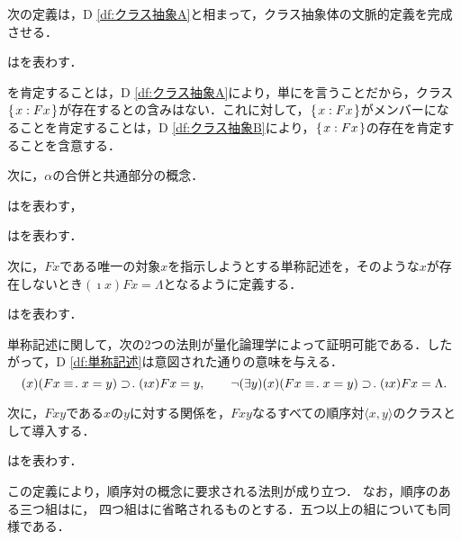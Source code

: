 次の定義は，D \ref{df:クラス抽象A}と相まって，クラス抽象体の文脈的定義を完成させる．

\begin{df}
\label{df:クラス抽象B}
はを表わす．
\end{df}
\noindent{}を肯定することは，D \ref{df:クラス抽象A}により，単にを言うことだから，クラス$\{\mspace{2mu}x:Fx\mspace{2mu}\}$が存在するとの含みはない．これに対して，$ \{\mspace{2mu}x:Fx\mspace{2mu}\} $がメンバーになることを肯定することは，D \ref{df:クラス抽象B}により，$ \{\mspace{2mu}x:Fx\mspace{2mu}\} $の存在を肯定することを含意する．

次に，$\alpha$の合併と共通部分の概念．

\begin{df}
\label{df:クラスの合併}
\kagi{$
    \union{\alpha}
$}はを表わす，
\end{df}

\begin{df}
\label{df:クラスの共通部分}
\kagi{$
    \intersect{\alpha}
$}はを表わす．
\end{df}

次に，$ Fx $である唯一の対象$x$を指示しようとする単称記述を，そのような$ x $が存在しないとき$ (\imath x)Fx=\Lambda $となるように定義する．

\begin{df}
\label{df:単称記述}
はを表わす．
\end{df}
\noindent 単称記述に関して，次の2つの法則が量化論理学によって証明可能である．したがって，D \ref{df:単称記述}は意図された通りの意味を与える．
\[
    (x)(Fx\case{3}{0}{1}x=y)\case{1}{0}{1}(\imath x)Fx=y,\qquad \neg(\exists y)(x)(Fx\case{3}{0}{1}x=y)\case{1}{0}{1}(\imath x)Fx=\Lambda.
\]

次に，$Fxy$である$x$の$y$に対する関係を，$Fxy$なるすべての順序対$\langle x,y \rangle$のクラスとして導入する．

\begin{df}[順序対]
\label{df:順序対}
\kagi{$
    \orp{\alpha,\beta}
$}は\kagi{$
    \classab{\classab{\alpha},\classab{\alpha,\beta}}
$}を表わす．
\end{df}
\noindent この定義により，順序対の概念に要求される法則が成り立つ．
なお，順序のある三つ組\kagi{$\orp{\alpha,\orp{\beta,\gamma}}$}は\kagi{$\orp{\alpha,\beta,\gamma}$}に，
四つ組\kagi{$\orp{\alpha,\orp{\beta,\gamma,\delta}}$}は\kagi{$\orp{\alpha,\beta,\gamma,\delta}$}に省略されるものとする．五つ以上の組についても同様である．

